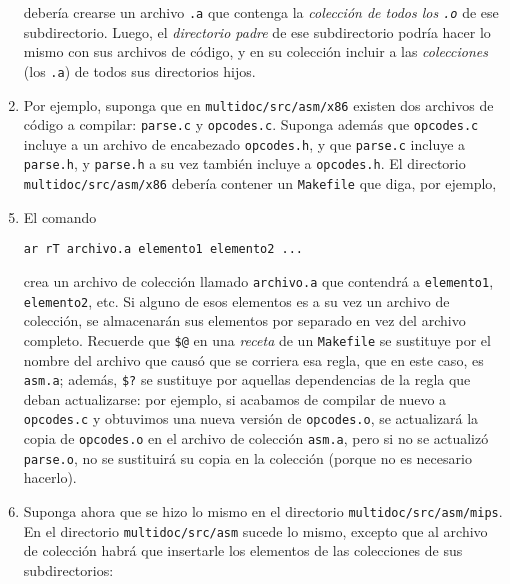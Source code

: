 \documentclass[]{article}
\newenvironment{Shaded}{}{}
\newcommand{\DecValTok}[1]{\textcolor[rgb]{0.25,0.63,0.44}{{#1}}}
\newcommand{\CharTok}[1]{\textcolor[rgb]{0.25,0.44,0.63}{{#1}}}
\newcommand{\NormalTok}[1]{{#1}}
\begin{document}
\begin{enumerate}[1.]
  debería crearse un archivo \texttt{.a} que contenga la \emph{colección
  de todos los \texttt{.o}} de ese subdirectorio. Luego, el
  \emph{directorio padre} de ese subdirectorio podría hacer lo mismo con
  sus archivos de código, y en su colección incluir a las
  \emph{colecciones} (los \texttt{.a}) de todos sus directorios hijos.
\item
  Por ejemplo, suponga que en \texttt{multidoc/src/asm/x86} existen dos
  archivos de código a compilar: \texttt{parse.c} y \texttt{opcodes.c}.
  Suponga además que \texttt{opcodes.c} incluye a un archivo de
  encabezado \texttt{opcodes.h}, y que \texttt{parse.c} incluye a
  \texttt{parse.h}, y \texttt{parse.h} a su vez también incluye a
  \texttt{opcodes.h}. El directorio \texttt{multidoc/src/asm/x86}
  debería contener un \texttt{Makefile} que diga, por ejemplo,
\end{enumerate}
\begin{Shaded}
\end{Shaded}
\begin{enumerate}[1.]
\setcounter{enumi}{4}
\item
  El comando

\begin{verbatim}
ar rT archivo.a elemento1 elemento2 ...
\end{verbatim}
  crea un archivo de colección llamado \texttt{archivo.a} que contendrá
  a \texttt{elemento1}, \texttt{elemento2}, etc. Si alguno de esos
  elementos es a su vez un archivo de colección, se almacenarán sus
  elementos por separado en vez del archivo completo. Recuerde que
  \texttt{\$@} en una \emph{receta} de un \texttt{Makefile} se sustituye
  por el nombre del archivo que causó que se corriera esa regla, que en
  este caso, es \texttt{asm.a}; además, \texttt{\$?} se sustituye por
  aquellas dependencias de la regla que deban actualizarse: por ejemplo,
  si acabamos de compilar de nuevo a \texttt{opcodes.c} y obtuvimos una
  nueva versión de \texttt{opcodes.o}, se actualizará la copia de
  \texttt{opcodes.o} en el archivo de colección \texttt{asm.a}, pero si
  no se actualizó \texttt{parse.o}, no se sustituirá su copia en la
  colección (porque no es necesario hacerlo).
\item
  Suponga ahora que se hizo lo mismo en el directorio
  \texttt{multidoc/src/asm/mips}. En el directorio
  \texttt{multidoc/src/asm} sucede lo mismo, excepto que al archivo de
  colección habrá que insertarle los elementos de las colecciones de sus
  subdirectorios:
\end{enumerate}
\end{document}
